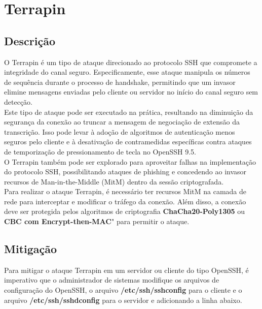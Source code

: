 \documentclass[12pt]{article}
\begin{document}
\section{Terrapin}

\subsection{Descrição}

O Terrapin é um tipo de ataque direcionado ao protocolo SSH que compromete a integridade do canal seguro. Especificamente, esse ataque manipula os números de sequência durante o processo de handshake, permitindo que um invasor elimine mensagens enviadas pelo cliente ou servidor no início do canal seguro sem detecção.\\

Este tipo de ataque pode ser executado na prática, resultando na diminuição da segurança da conexão ao truncar a mensagem de negociação de extensão da transcrição. Isso pode levar à adoção de algoritmos de autenticação menos seguros pelo cliente e à desativação de contramedidas específicas contra ataques de temporização de pressionamento de tecla no OpenSSH 9.5.\\

O Terrapin também pode ser explorado para aproveitar falhas na implementação do protocolo SSH, possibilitando ataques de phishing e concedendo ao invasor recursos de Man-in-the-Middle (MitM) dentro da sessão criptografada.\\

Para realizar o ataque Terrapin, é necessário ter recursos MitM na camada de rede para interceptar e modificar o tráfego da conexão. Além disso, a conexão deve ser protegida pelos algoritmos de criptografia \textbf{ChaCha20-Poly1305} ou \textbf{CBC com Encrypt-then-MAC}" para permitir o ataque.\\

\subsection{Mitigação}

Para mitigar o ataque Terrapin em um servidor ou cliente do tipo OpenSSH, é imperativo que o administrador de sistemas modifique os arquivos de configuração do OpenSSH, o arquivo \textbf{/etc/ssh/ssh\underline{\hspace{.1in}}config} para o cliente e o arquivo \textbf{/etc/ssh/sshd\underline{\hspace{.1in}}config} para o servidor e adicionando a linha abaixo.\\
\end{document}
